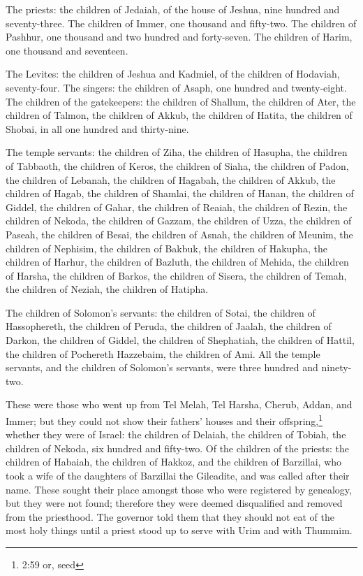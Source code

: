  The priests: the children of Jedaiah, of the house of
Jeshua, nine hundred and seventy-three.  The children of
Immer, one thousand and fifty-two.  The children of
Pashhur, one thousand and two hundred and forty-seven.  The
children of Harim, one thousand and seventeen.

 The Levites: the children of Jeshua and Kadmiel, of the
children of Hodaviah, seventy-four.  The singers: the
children of Asaph, one hundred and twenty-eight.  The
children of the gatekeepers: the children of Shallum, the children of
Ater, the children of Talmon, the children of Akkub, the children of
Hatita, the children of Shobai, in all one hundred and thirty-nine.

 The temple servants: the children of Ziha, the children of
Hasupha, the children of Tabbaoth,  the children of Keros,
the children of Siaha, the children of Padon,  the children
of Lebanah, the children of Hagabah, the children of Akkub,
 the children of Hagab, the children of Shamlai, the
children of Hanan,  the children of Giddel, the children of
Gahar, the children of Reaiah,  the children of Rezin, the
children of Nekoda, the children of Gazzam,  the children
of Uzza, the children of Paseah, the children of Besai, 
the children of Asnah, the children of Meunim, the children of Nephisim,
 the children of Bakbuk, the children of Hakupha, the
children of Harhur,  the children of Bazluth, the children
of Mehida, the children of Harsha,  the children of Barkos,
the children of Sisera, the children of Temah,  the
children of Neziah, the children of Hatipha.

 The children of Solomon's servants: the children of Sotai,
the children of Hassophereth, the children of Peruda,  the
children of Jaalah, the children of Darkon, the children of Giddel,
 the children of Shephatiah, the children of Hattil, the
children of Pochereth Hazzebaim, the children of Ami.  All
the temple servants, and the children of Solomon's servants, were three
hundred and ninety-two.

 These were those who went up from Tel Melah, Tel Harsha,
Cherub, Addan, and Immer; but they could not show their fathers' houses
and their offspring,\footnote{2:59 or, seed} whether they were of
Israel:  the children of Delaiah, the children of Tobiah,
the children of Nekoda, six hundred and fifty-two.  Of the
children of the priests: the children of Habaiah, the children of
Hakkoz, and the children of Barzillai, who took a wife of the daughters
of Barzillai the Gileadite, and was called after their name.
 These sought their place amongst those who were registered
by genealogy, but they were not found; therefore they were deemed
disqualified and removed from the priesthood.  The governor
told them that they should not eat of the most holy things until a
priest stood up to serve with Urim and with Thummim.

